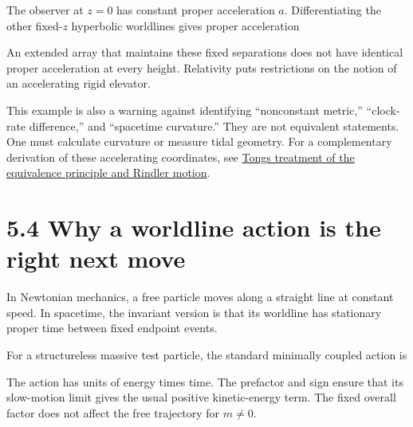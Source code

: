 \documentclass[
  11pt,
  letterpaper,
  oneside,
  openany]{scrbook}
\begin{document}
The observer at \(z=0\) has constant proper acceleration \(a\).
Differentiating the other fixed-\(z\) hyperbolic worldlines gives proper
acceleration

\begin{center}
\begingroup
{}
\ifdim\wd\grmathbox>\linewidth
\resizebox{\linewidth}{!}{\usebox{\grmathbox}}
\else\usebox{\grmathbox}\fi
\endgroup
\end{center}

An extended array that maintains these fixed separations does not have
identical proper acceleration at every height. Relativity puts
restrictions on the notion of an accelerating rigid elevator.

This example is also a warning against identifying ``nonconstant
metric,'' ``clock-rate difference,'' and ``spacetime curvature.'' They
are not equivalent statements. One must calculate curvature or measure
tidal geometry. For a complementary derivation of these accelerating
coordinates, see
\href{https://davidtong.org/pdfs/teaching/general-relativity/gr1.pdf}{Tong\textquotesingle s
treatment of the equivalence principle and Rindler motion}.

\hypertarget{why-a-worldline-action-is-the-right-next-move}{%
\section{5.4 Why a worldline action is the right next
move}\label{why-a-worldline-action-is-the-right-next-move}}

In Newtonian mechanics, a free particle moves along a straight line at
constant speed. In spacetime, the invariant version is that its
worldline has stationary proper time between fixed endpoint events.

For a structureless massive test particle, the standard minimally
coupled action is

\begin{center}
\begingroup
{}
\ifdim\wd\grmathbox>\linewidth
\resizebox{\linewidth}{!}{\usebox{\grmathbox}}
\else\usebox{\grmathbox}\fi
\endgroup
\end{center}

The action has units of energy times time. The prefactor and sign ensure
that its slow-motion limit gives the usual positive kinetic-energy term.
The fixed overall factor does not affect the free trajectory for
\(m\ne0\).
\end{document}
